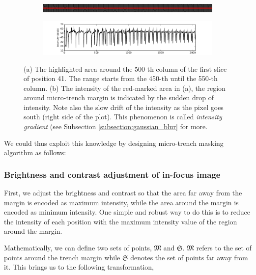 \documentclass[pdftex,12pt,a4paper]{report}
\begin{document}
\begin{figure}[H]
\centering

\begin{subfigure}{\textwidth}
  \centering
  \includegraphics[width=\textwidth]{images/pos_41_cut_highlight_y_500}
  \caption{}
  \label{fig:pos41_highlight}
\end{subfigure}%

\begin{subfigure}{\textwidth}
  \centering
  \includegraphics[width=\textwidth]{images/pos_41_cut_highlight_y_500_contrast}
  \caption{}
  \label{fig:pos41_contrast}
\end{subfigure}%
\caption{(a) The highlighted area around the 500-th column of the first slice of position 41. The range starts from the 450-th until the 550-th column. (b) The intensity of the red-marked area in (a), the region around micro-trench margin is indicated by the sudden drop of intensity. Note also the slow drift of the intensity as the pixel goes south (right side of the plot). This phenomenon is called \textit{intensity gradient} (see Subsection \ref{subsection:gaussian_blur} for more.}
\label{fig:pos41_brightness}
\end{figure}

We could thus exploit this knowledge by designing micro-trench masking algorithm as follows:

\subsubsection*{Brightness and contrast adjustment of in-focus image}
\label{subsubsection:brightness_contrast_adjustment}

First, we adjust the brightness and contrast so that the area far away from the margin is encoded as maximum intensity, while the area around the margin is encoded as minimum intensity. One simple and robust way to do this is to reduce the intensity of each position with the maximum intensity value of the region around the margin.

Mathematically, we can define two sets of points, $\mathfrak{M}$ and $\mathfrak{S}$. $\mathfrak{M}$ refers to the set of points around the trench margin while $\mathfrak{S}$ denotes the set of points far away from it. This brings us to the following transformation,
\end{document}
